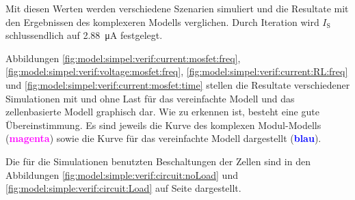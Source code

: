 Mit diesen  Werten werden verschiedene  Szenarien simuliert und  die Resultate
mit den  Ergebnissen des komplexeren Modells  verglichen. Durch Iteration wird
$I_{\mathrm{S}}$ schlussendlich  auf \SI{2.88}{\micro\ampere}  festgelegt.

Abbildungen
\ref{fig:model:simpel:verif:current:mosfet:freq},
\ref{fig:model:simpel:verif:voltage:mosfet:freq},
\ref{fig:model:simpel:verif:current:RL:freq} und
\ref{fig:model:simpel:verif:current:mosfet:time} stellen die Resultate
verschiedener Simulationen mit und ohne Last f\"ur das vereinfachte Modell und
das zellenbasierte  Modell graphisch dar.   Wie zu erkennen ist,  besteht eine
gute \"Ubereinstimmung. Es sind jeweils  die Kurve des komplexen Modul-Modells
(\textbf{\textcolor{magenta}{magenta}}) sowie die Kurve f\"ur das vereinfachte
Modell dargestellt (\textbf{\textcolor{blue}{blau}}).

Die   f\"ur    die   Simulationen    benutzten   Beschaltungen    der   Zellen
sind    in    den   Abbildungen    \ref{fig:model:simple:verif:circuit:noLoad}
und         \ref{fig:model:simple:verif:circuit:Load}        auf         Seite
\pageref{fig:model:simple:verif:circuit:Load} dargestellt.



